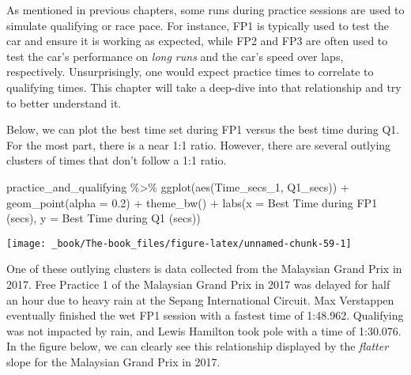 \documentclass[
]{book}
\newenvironment{Shaded}{\begin{snugshade}}{\end{snugshade}}
\newcommand{\AttributeTok}[1]{\textcolor[rgb]{0.77,0.63,0.00}{#1}}
\newcommand{\FloatTok}[1]{\textcolor[rgb]{0.00,0.00,0.81}{#1}}
\newcommand{\FunctionTok}[1]{\textcolor[rgb]{0.00,0.00,0.00}{#1}}
\newcommand{\NormalTok}[1]{#1}
\newcommand{\SpecialCharTok}[1]{\textcolor[rgb]{0.00,0.00,0.00}{#1}}
\newcommand{\StringTok}[1]{\textcolor[rgb]{0.31,0.60,0.02}{#1}}
\begin{document}
As mentioned in previous chapters, some runs during practice sessions are used to simulate qualifying or race pace. For instance, FP1 is typically used to test the car and ensure it is working as expected, while FP2 and FP3 are often used to test the car's performance on \emph{long runs} and the car's speed over laps, respectively. Unsurprisingly, one would expect practice times to correlate to qualifying times. This chapter will take a deep-dive into that relationship and try to better understand it.

Below, we can plot the best time set during FP1 versus the best time during Q1. For the most part, there is a near 1:1 ratio. However, there are several outlying clusters of times that don't follow a 1:1 ratio.

\begin{Shaded}
\begin{Highlighting}[]
\NormalTok{practice\_and\_qualifying }\SpecialCharTok{\%\textgreater{}\%}
  \FunctionTok{ggplot}\NormalTok{(}\FunctionTok{aes}\NormalTok{(Time\_secs\_1, Q1\_secs)) }\SpecialCharTok{+}
  \FunctionTok{geom\_point}\NormalTok{(}\AttributeTok{alpha =} \FloatTok{0.2}\NormalTok{) }\SpecialCharTok{+}
  \FunctionTok{theme\_bw}\NormalTok{() }\SpecialCharTok{+}
  \FunctionTok{labs}\NormalTok{(}\AttributeTok{x =} \StringTok{\textquotesingle{}Best Time during FP1 (secs)\textquotesingle{}}\NormalTok{,}
       \AttributeTok{y =} \StringTok{\textquotesingle{}Best Time during Q1 (secs)\textquotesingle{}}\NormalTok{)}
\end{Highlighting}
\end{Shaded}

\begin{center}\texttt{[image: \_book/The-book\_files/figure-latex/unnamed-chunk-59-1]} \end{center}

One of these outlying clusters is data collected from the Malaysian Grand Prix in 2017. Free Practice 1 of the Malaysian Grand Prix in 2017 was delayed for half an hour due to heavy rain at the Sepang International Circuit. Max Verstappen eventually finished the wet FP1 session with a fastest time of 1:48.962. Qualifying was not impacted by rain, and Lewis Hamilton took pole with a time of 1:30.076. In the figure below, we can clearly see this relationship displayed by the \emph{flatter} slope for the Malaysian Grand Prix in 2017.
\end{document}
